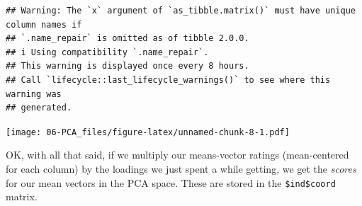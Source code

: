 \documentclass[
]{book}
\newenvironment{Shaded}{\begin{snugshade}}{\end{snugshade}}
\newcommand{\AttributeTok}[1]{\textcolor[rgb]{0.13,0.29,0.53}{#1}}
\newcommand{\DecValTok}[1]{\textcolor[rgb]{0.00,0.00,0.81}{#1}}
\newcommand{\FloatTok}[1]{\textcolor[rgb]{0.00,0.00,0.81}{#1}}
\newcommand{\FunctionTok}[1]{\textcolor[rgb]{0.13,0.29,0.53}{\textbf{#1}}}
\newcommand{\NormalTok}[1]{#1}
\newcommand{\OtherTok}[1]{\textcolor[rgb]{0.56,0.35,0.01}{#1}}
\newcommand{\SpecialCharTok}[1]{\textcolor[rgb]{0.81,0.36,0.00}{\textbf{#1}}}
\newcommand{\StringTok}[1]{\textcolor[rgb]{0.31,0.60,0.02}{#1}}
\begin{document}
\begin{verbatim}
## Warning: The `x` argument of `as_tibble.matrix()` must have unique column names if
## `.name_repair` is omitted as of tibble 2.0.0.
## i Using compatibility `.name_repair`.
## This warning is displayed once every 8 hours.
## Call `lifecycle::last_lifecycle_warnings()` to see where this warning was
## generated.
\end{verbatim}

\texttt{[image: 06-PCA\_files/figure-latex/unnamed-chunk-8-1.pdf]}

OK, with all that said, if we multiply our means-vector ratings (mean-centered for each column) by the loadings we just spent a while getting, we get the \emph{scores} for our mean vectors in the PCA space. These are stored in the \texttt{\$ind\$coord} matrix.

\begin{Shaded}
\end{Shaded}
\end{document}
